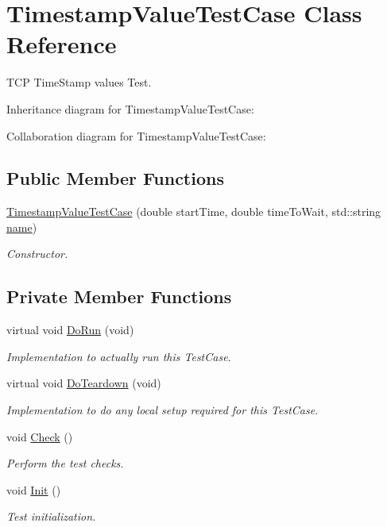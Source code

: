 \hypertarget{classTimestampValueTestCase}{}\section{Timestamp\+Value\+Test\+Case Class Reference}
\label{classTimestampValueTestCase}


T\+CP Time\+Stamp values Test.  




Inheritance diagram for Timestamp\+Value\+Test\+Case\+:


Collaboration diagram for Timestamp\+Value\+Test\+Case\+:
\subsection*{Public Member Functions}
\begin{DoxyCompactItemize}
\item 
\hyperlink{classTimestampValueTestCase_a1241e02ec46520259d9e916296134cdf}{Timestamp\+Value\+Test\+Case} (double start\+Time, double time\+To\+Wait, std\+::string \hyperlink{generate__test__data__lte__spectrum__model_8m_ab74e6bf80237ddc4109968cedc58c151}{name})
\begin{DoxyCompactList}\small\item\em Constructor. \end{DoxyCompactList}\end{DoxyCompactItemize}
\subsection*{Private Member Functions}
\begin{DoxyCompactItemize}
\item 
virtual void \hyperlink{classTimestampValueTestCase_a48b224edb77d5b964c265a694583ea57}{Do\+Run} (void)
\begin{DoxyCompactList}\small\item\em Implementation to actually run this Test\+Case. \end{DoxyCompactList}\item 
virtual void \hyperlink{classTimestampValueTestCase_af32e1598d26e842187cb6b18b131f9b8}{Do\+Teardown} (void)
\begin{DoxyCompactList}\small\item\em Implementation to do any local setup required for this Test\+Case. \end{DoxyCompactList}\item 
void \hyperlink{classTimestampValueTestCase_acde3ba3966f65c93c76c2ea6fb412216}{Check} ()
\begin{DoxyCompactList}\small\item\em Perform the test checks. \end{DoxyCompactList}\item 
void \hyperlink{classTimestampValueTestCase_ad4fc0b565d0f63ff8fb80f218dfc0a12}{Init} ()
\begin{DoxyCompactList}\small\item\em Test initialization. \end{DoxyCompactList}\end{DoxyCompactItemize}
